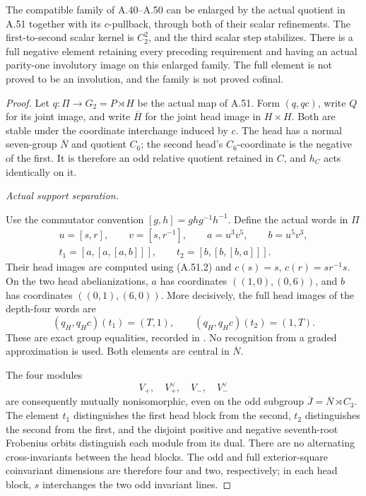 The compatible family of A.40--A.50 can be enlarged
by the actual quotient in A.51 together with its
\(c\)-pullback, through both of their scalar
refinements. The first-to-second scalar kernel is
\(C_2^2\), and the third scalar step stabilizes.
There is a full negative element retaining every
preceding requirement and having an actual
parity-one involutory image on this enlarged family.
The full element is not proved to be an involution,
and the family is not proved cofinal.

\begin{proof}
Let \(q:\Pi\to G_2=P\rtimes H\) be the actual
map of A.51. Form \((q,qc)\), write \(Q\) for
its joint image, and write \(\overline H\) for
the joint head image in \(H\times H\).
Both are stable under the coordinate interchange
induced by \(c\). The head has a normal seven-group
\(\overline N\) and quotient \(C_6\); the second
head's \(C_6\)-coordinate is the negative of the
first. It is therefore an odd relative quotient
retained in \(C\), and \(h_C\) acts identically
on it.

\emph{Actual support separation.}\par
Use the commutator convention
\([g,h]=ghg^{-1}h^{-1}\). Define the actual
words in \(\Pi\)
\[
\begin{gathered}
 u=[s,r],\qquad v=[s,r^{-1}],\qquad
 a=u^3v^5,\qquad b=u^5v^3,\\
 t_1=[a,[a,[a,b]]],\qquad
 t_2=[b,[b,[b,a]]].
\end{gathered}                                       \tag{A.52.1}
\]
Their head images are computed using (A.51.2)
and \(c(s)=s\), \(c(r)=sr^{-1}s\).
On the two head abelianizations, \(a\) has
coordinates \(((1,0),(0,6))\), and \(b\) has
coordinates \(((0,1),(6,0))\). More decisively,
the full head images of the depth-four words are
\[
               (q_H,q_Hc)(t_1)=(T,1),\qquad
               (q_H,q_Hc)(t_2)=(1,T).
                                                               \tag{A.52.2}
\]
These are exact group equalities, recorded in
. No recognition
from a graded approximation is used. Both elements
are central in \(\overline N\).

The four modules
\[
                  V_+,\quad V_+^\vee,\quad
                  V_-,\quad V_-^\vee
                                                               \tag{A.52.3}
\]
are consequently mutually nonisomorphic, even
on the odd subgroup
\(\overline J=\overline N\rtimes C_3\).
The element \(t_1\) distinguishes the first
head block from the second, \(t_2\) distinguishes
the second from the first, and the disjoint
positive and negative seventh-root Frobenius
orbits distinguish each module from its dual.
There are no alternating cross-invariants between
the head blocks. The odd and full exterior-square
coinvariant dimensions are therefore four and
two, respectively; in each head block, \(s\)
interchanges the two odd invariant lines.


\end{proof}
